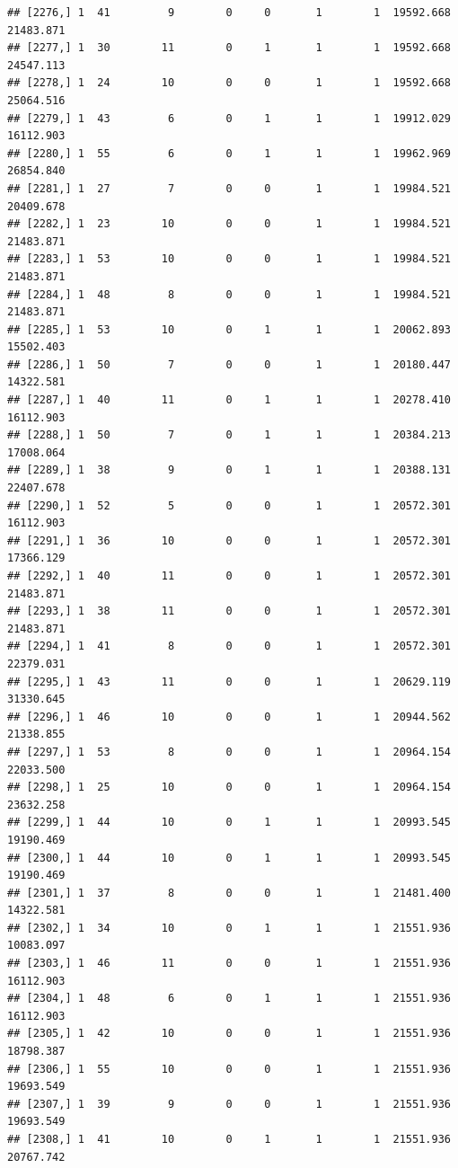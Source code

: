 \documentclass[
]{article}
\begin{document}
\begin{verbatim}
## [2276,] 1  41         9        0     0       1        1  19592.668  21483.871
## [2277,] 1  30        11        0     1       1        1  19592.668  24547.113
## [2278,] 1  24        10        0     0       1        1  19592.668  25064.516
## [2279,] 1  43         6        0     1       1        1  19912.029  16112.903
## [2280,] 1  55         6        0     1       1        1  19962.969  26854.840
## [2281,] 1  27         7        0     0       1        1  19984.521  20409.678
## [2282,] 1  23        10        0     0       1        1  19984.521  21483.871
## [2283,] 1  53        10        0     0       1        1  19984.521  21483.871
## [2284,] 1  48         8        0     0       1        1  19984.521  21483.871
## [2285,] 1  53        10        0     1       1        1  20062.893  15502.403
## [2286,] 1  50         7        0     0       1        1  20180.447  14322.581
## [2287,] 1  40        11        0     1       1        1  20278.410  16112.903
## [2288,] 1  50         7        0     1       1        1  20384.213  17008.064
## [2289,] 1  38         9        0     1       1        1  20388.131  22407.678
## [2290,] 1  52         5        0     0       1        1  20572.301  16112.903
## [2291,] 1  36        10        0     0       1        1  20572.301  17366.129
## [2292,] 1  40        11        0     0       1        1  20572.301  21483.871
## [2293,] 1  38        11        0     0       1        1  20572.301  21483.871
## [2294,] 1  41         8        0     0       1        1  20572.301  22379.031
## [2295,] 1  43        11        0     0       1        1  20629.119  31330.645
## [2296,] 1  46        10        0     0       1        1  20944.562  21338.855
## [2297,] 1  53         8        0     0       1        1  20964.154  22033.500
## [2298,] 1  25        10        0     0       1        1  20964.154  23632.258
## [2299,] 1  44        10        0     1       1        1  20993.545  19190.469
## [2300,] 1  44        10        0     1       1        1  20993.545  19190.469
## [2301,] 1  37         8        0     0       1        1  21481.400  14322.581
## [2302,] 1  34        10        0     1       1        1  21551.936  10083.097
## [2303,] 1  46        11        0     0       1        1  21551.936  16112.903
## [2304,] 1  48         6        0     1       1        1  21551.936  16112.903
## [2305,] 1  42        10        0     0       1        1  21551.936  18798.387
## [2306,] 1  55        10        0     0       1        1  21551.936  19693.549
## [2307,] 1  39         9        0     0       1        1  21551.936  19693.549
## [2308,] 1  41        10        0     1       1        1  21551.936  20767.742

\end{verbatim}
\end{document}
